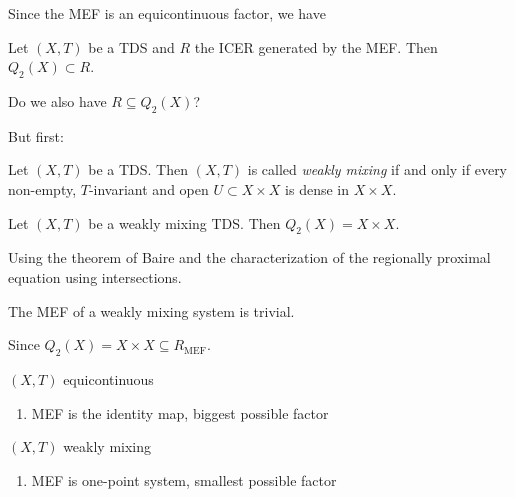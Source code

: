 \begin{frame}
  Since the MEF is an equicontinuous factor, we have
  \begin{corollary}
    Let $(X, T)$ be a TDS and $R$ the ICER generated by the MEF.
    Then $Q_2(X) \subset R$.
  \end{corollary}
  Do we also have $R \subseteq Q_2(X)$?
\end{frame}

\begin{frame}
  But first:
  \begin{definition}
    Let $(X,T)$ be a TDS. Then $(X,T)$ is called \emph{weakly mixing} if and only if every non-empty, $T$-invariant and open $U\subset X \times X$ is dense in $X \times X$.
  \end{definition}
  \pause
  \begin{proposition}
    Let $(X,T)$ be a weakly mixing TDS. Then $Q_2(X) = X \times X$.
  \end{proposition}
  Using the theorem of Baire and the characterization of the
  regionally proximal equation using intersections.
  \pause
  \begin{corollary}
    The MEF of a weakly mixing system is trivial.
  \end{corollary}
  Since $Q_2(X) = X \times X \subseteq R_\text{MEF}$.
\end{frame}

\begin{frame}
  \begin{minipage}{0.45\textwidth}
    \begin{center}
      $(X, T)$ equicontinuous
      \vspace{2em}
      \begin{enumerate}
        \item MEF is the identity map, biggest possible factor
      \end{enumerate}
    \end{center}
  \end{minipage}%
  \begin{minipage}{0.45\textwidth}
    \begin{center}
      $(X, T)$ weakly mixing
      \vspace{2em}
      \begin{enumerate}
        \item MEF is one-point system, smallest possible factor
      \end{enumerate}
    \end{center}
  \end{minipage}
\end{frame}

